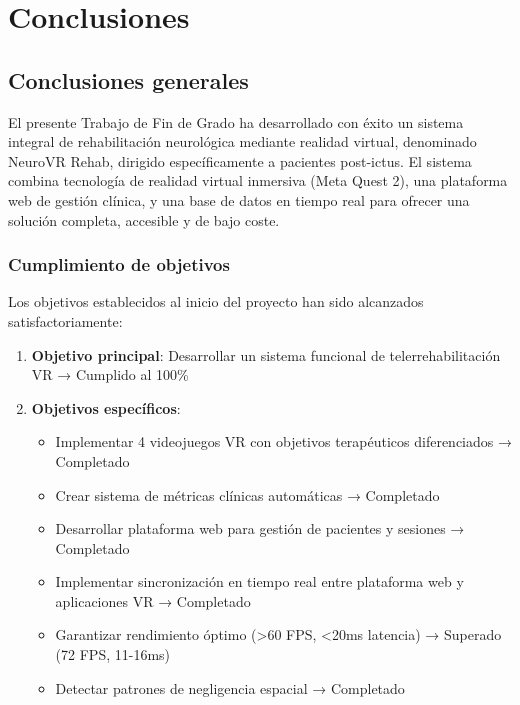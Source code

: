 \chapter{Conclusiones}

\section{Conclusiones generales}

El presente Trabajo de Fin de Grado ha desarrollado con éxito un sistema integral de rehabilitación neurológica mediante realidad virtual, denominado NeuroVR Rehab, dirigido específicamente a pacientes post-ictus. El sistema combina tecnología de realidad virtual inmersiva (Meta Quest 2), una plataforma web de gestión clínica, y una base de datos en tiempo real para ofrecer una solución completa, accesible y de bajo coste.

\subsection{Cumplimiento de objetivos}

Los objetivos establecidos al inicio del proyecto han sido alcanzados satisfactoriamente:

\begin{enumerate}
    \item \textbf{Objetivo principal}: Desarrollar un sistema funcional de telerrehabilitación VR → Cumplido al 100\%
    
    \item \textbf{Objetivos específicos}:
    \begin{itemize}
        \item Implementar 4 videojuegos VR con objetivos terapéuticos diferenciados → Completado
        \item Crear sistema de métricas clínicas automáticas → Completado
        \item Desarrollar plataforma web para gestión de pacientes y sesiones → Completado
        \item Implementar sincronización en tiempo real entre plataforma web y aplicaciones VR → Completado
        \item Garantizar rendimiento óptimo (>60 FPS, <20ms latencia) → Superado (72 FPS, 11-16ms)
        \item Detectar patrones de negligencia espacial → Completado
    \end{itemize}
\end{enumerate}

